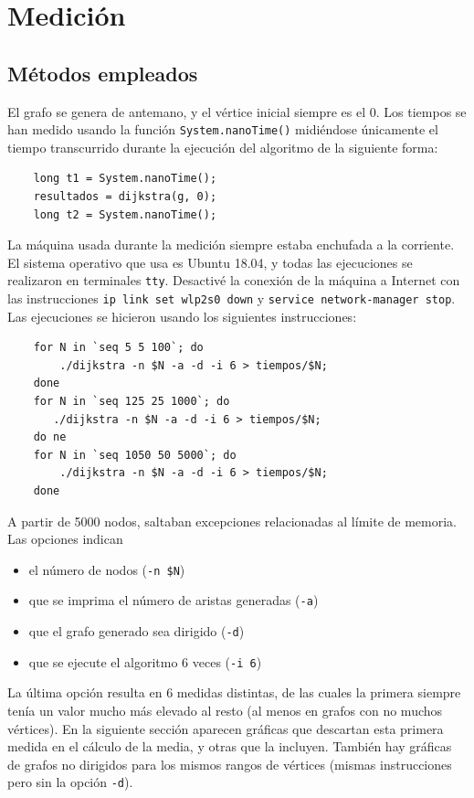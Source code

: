 \documentclass[12pt , a4paper]{article}
\begin{document}
\section{Medición}
\subsection{Métodos empleados}
	El grafo se genera de antemano, y el vértice inicial siempre es el 0. Los tiempos se han medido usando la función \texttt{System.nanoTime()} midiéndose únicamente el tiempo transcurrido durante la ejecución del algoritmo de la siguiente forma:
	\begin{verbatim}
	long t1 = System.nanoTime();
	resultados = dijkstra(g, 0);
	long t2 = System.nanoTime();
	\end{verbatim}
	
	La máquina usada durante la medición siempre estaba enchufada a la corriente. El sistema operativo que usa es Ubuntu 18.04, y todas las ejecuciones se realizaron en terminales \texttt{tty}. Desactivé la conexión de la máquina a Internet con las instrucciones \texttt{ip link set wlp2s0 down} y \texttt{service network-manager stop}. Las ejecuciones se hicieron usando los siguientes instrucciones:
	\begin{verbatim}
	for N in `seq 5 5 100`; do 
	    ./dijkstra -n $N -a -d -i 6 > tiempos/$N; 
	done
	for N in `seq 125 25 1000`; do 
	   ./dijkstra -n $N -a -d -i 6 > tiempos/$N;
	do ne
	for N in `seq 1050 50 5000`; do 
	    ./dijkstra -n $N -a -d -i 6 > tiempos/$N; 
	done
	\end{verbatim}
	A partir de 5000 nodos, saltaban excepciones relacionadas al límite de memoria. Las opciones indican
	\begin{itemize}
		\item el número de nodos (\texttt{-n \$N})
		\item que se imprima el número de aristas generadas (\texttt{-a})
		\item que el grafo generado sea dirigido (\texttt{-d})
		\item que se ejecute el algoritmo 6 veces (\texttt{-i 6})
	\end{itemize} 
	La última opción resulta en 6 medidas distintas, de las cuales la primera siempre tenía un valor mucho más elevado al resto (al menos en grafos con no muchos vértices). En la siguiente sección aparecen gráficas que descartan esta primera medida en el cálculo de la media, y otras que la incluyen. También hay gráficas de grafos no dirigidos para los mismos rangos de vértices (mismas instrucciones pero sin la opción \texttt{-d}).
	
\end{document}

